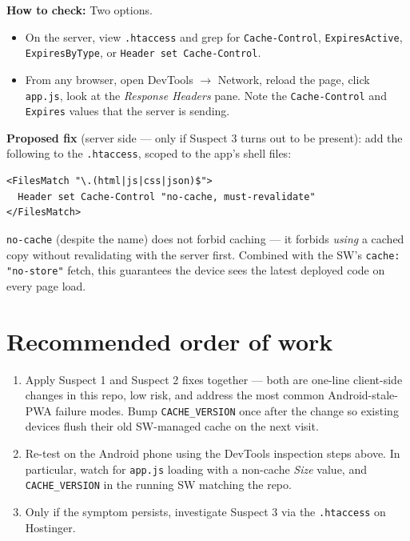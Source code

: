 \documentclass[11pt,a4paper]{article}
\begin{document}
\textbf{How to check:} Two options.
\begin{itemize}[leftmargin=1.6em]
  \item On the server, view \texttt{.htaccess} and grep for \texttt{Cache-Control}, \texttt{ExpiresActive}, \texttt{ExpiresByType}, or \texttt{Header set Cache-Control}.
  \item From any browser, open DevTools $\to$ Network, reload the page, click \texttt{app.js}, look at the \emph{Response Headers} pane. Note the \texttt{Cache-Control} and \texttt{Expires} values that the server is sending.
\end{itemize}

\textbf{Proposed fix} (server side --- only if Suspect 3 turns out to be present): add the following to the \texttt{.htaccess}, scoped to the app's shell files:

\begin{lstlisting}[language={}]
<FilesMatch "\.(html|js|css|json)$">
  Header set Cache-Control "no-cache, must-revalidate"
</FilesMatch>
\end{lstlisting}

\texttt{no-cache} (despite the name) does not forbid caching --- it forbids \emph{using} a cached copy without revalidating with the server first. Combined with the SW's \texttt{cache: "no-store"} fetch, this guarantees the device sees the latest deployed code on every page load.

\section{Recommended order of work}

\begin{enumerate}[leftmargin=1.6em]
  \item Apply Suspect 1 and Suspect 2 fixes together --- both are one-line client-side changes in this repo, low risk, and address the most common Android-stale-PWA failure modes. Bump \texttt{CACHE\_VERSION} once after the change so existing devices flush their old SW-managed cache on the next visit.
  \item Re-test on the Android phone using the DevTools inspection steps above. In particular, watch for \texttt{app.js} loading with a non-cache \emph{Size} value, and \texttt{CACHE\_VERSION} in the running SW matching the repo.
  \item Only if the symptom persists, investigate Suspect 3 via the \texttt{.htaccess} on Hostinger.
\end{enumerate}
\end{document}
